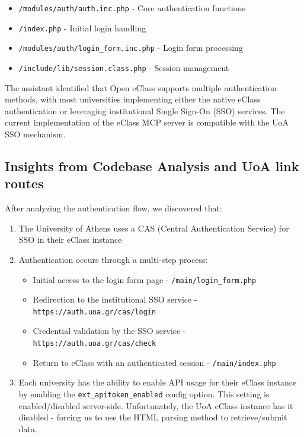 \documentclass[11pt,a4paper]{article}
\begin{document}
\begin{itemize}
    \item \texttt{/modules/auth/auth.inc.php} - Core authentication functions
    \item \texttt{/index.php} - Initial login handling
    \item \texttt{/modules/auth/login\_form.inc.php} - Login form processing
    \item \texttt{/include/lib/session.class.php} - Session management
\end{itemize}
The assistant identified that Open eClass supports multiple authentication methods, with most universities implementing either the native eClass authentication or leveraging institutional Single Sign-On (SSO) services. The current implementation of the eClass MCP server is compatible with the UoA SSO mechanism.

\subsection{Insights from Codebase Analysis and UoA link routes}
After analyzing the authentication flow, we discovered that:

\begin{enumerate}
    \item The University of Athens uses a CAS (Central Authentication Service) for SSO in their eClass instance
    \item Authentication occurs through a multi-step process:
    \begin{itemize}
        \item Initial access to the login form page - \texttt{/main/login\_form.php}
        \item Redirection to the institutional SSO service - \texttt{https://auth.uoa.gr/cas/login}
        \item Credential validation by the SSO service - \texttt{https://auth.uoa.gr/cas/check}
        \item Return to eClass with an authenticated session - \texttt{/main/index.php}
    \end{itemize}
    \item Each university has the ability to enable API usage for their eClass instance by enabling the \texttt{ext\_apitoken\_enabled} config option. This setting is enabled/disabled server-side. Unfortunately, the UoA eClass instance has it disabled - forcing us to use the HTML parsing method to retrieve/submit data.
\end{enumerate}
\end{document}
